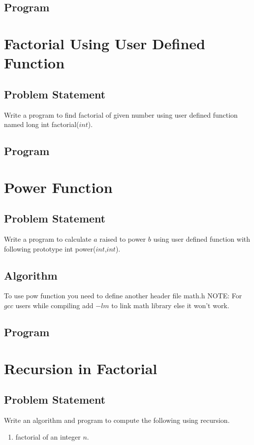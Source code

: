 \documentclass[11pt]{report}
\begin{document}
\section{Program}


\chapter{Factorial Using User Defined Function}
\section{Problem Statement}
Write a program to find factorial of given number using user defined function named long int factorial($int$).

\section{Program}


\chapter{Power Function}
\section{Problem Statement}
Write a program to calculate $a$ raised to power $b$ using user defined function with following prototype int power($int$,$int$).
\section{Algorithm}
To use pow function you need to define another header file math.h
NOTE: For $gcc$ users while compiling add $-lm$ to link math library else it won't work.
\section{Program}
		
		

\chapter{Recursion in Factorial}
\section{Problem Statement}
Write an algorithm and program to compute the following using recursion.
\begin{enumerate}
  \item factorial of an integer $n$.
\end{enumerate}
\end{document}
